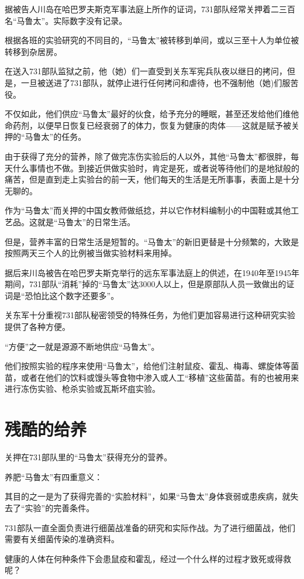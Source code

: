 \documentclass[a4paper,12pt,UTF8,twoside]{ctexbook}
\begin{document}
据被告人川岛在哈巴罗夫斯克军事法庭上所作的证词，731部队经常关押着二三百名“马鲁太”。实际数字没有记录。

根据各班的实验研究的不同目的，“马鲁太”被转移到单间，或以三至十人为单位被转移到杂居房。

在送入731部队监狱之前，他（她）们一直受到关东军宪兵队夜以继日的拷问，但是，一旦被送进了731部队，就停止进行任何拷问和虐待，也不强制他（她)们服苦役。

不仅如此，他们供应“马鲁太”最好的伙食，给予充分的睡眠，甚至还发给他们维他命药剂，以便早日恢复已经衰弱了的体力，恢复为健康的肉体——这就是赋予被关押的“马鲁太”的任务。

由于获得了充分的营养，除了做完冻伤实验后的人以外，其他“马鲁太”都很胖，每天什么事情也不做。到接近供做实验时，肯定是死，或者说等待他们的是地狱般的痛苦，但是直到走上实验台的前一天，他们每天的生活是无所事事，表面上是十分无聊的。

作为“马鲁太”而关押的中国女教师做纸捻，并以它作材料编制小的中国鞋或其他工艺品。这就是“马鲁太”的日常生活。

但是，营养丰富的日常生活是短暂的。“马鲁太”的新旧更替是十分频繁的，大致是按照两天三个人的比例被当做实验材料来用掉。

据后来川岛被告在哈巴罗夫斯克举行的远东军事法庭上的供述，在1940年至1945年期间，731部队“消耗”掉的“马鲁太”达3000人以上，但是原部队人员一致做出的证词是“恐怕比这个数字还要多”。

关东军十分重视731部队秘密领受的特殊任务，为他们更加容易进行这种研究实验提供了各种方便。

“方便”之一就是源源不断地供应“马鲁太”。

他们按照实验的程序来使用“马鲁太”，给他们注射鼠疫、霍乱、梅毒、螺旋体等菌苗，或者在他们的饮料或馒头等食物中渗入或人工“移植”这些菌苗。有的也被用来进行冻伤实验、枪杀实验或瓦斯坏疽实验。

\section{残酷的给养}

关押在731部队里的“马鲁太”获得充分的营养。

养肥“马鲁太”有四重意义：

其目的之一是为了获得完善的“实脸材料”，如果“马鲁太”身体衰弱或患疾病，就失去了“实验”的完善条件。

731部队一直全面负责进行细菌战准备的研究和实际作战。为了进行细菌战，他们需要有关细菌传染的准确资料。

健康的人体在何种条件下会患鼠疫和霍乱，经过一个什么样的过程才致死或得救呢？
\end{document}

